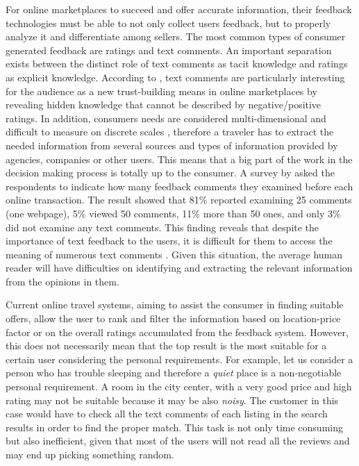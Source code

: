 For online marketplaces to succeed and offer accurate information, their feedback technologies must be able to not only collect users feedback, but to properly analyze it and differentiate among sellers. The most common types of consumer generated feedback are ratings and text comments.  An important separation exists between the distinct role of text comments as tacit knowledge and ratings as explicit knowledge. According to \cite{pavlou2006nature}, text comments are particularly interesting for the audience as a new trust-building means in online marketplaces by revealing hidden knowledge that cannot be described by negative/positive ratings. In addition, consumers needs are considered multi-dimensional and difficult to measure on discrete scales \cite{luo2005information}, therefore a traveler has to extract the needed information from several sources and types of information provided by agencies, companies or other users. This means that a big part of the work in the decision making process is totally up to the consumer. A survey by \cite{pavlou2006institutional} asked the respondents to indicate how many feedback comments they examined before each online transaction. The result showed that 81\% reported examining 25 comments (one webpage), 5\% viewed 50 comments, 11\% more than 50 ones, and only 3\% did not examine any text comments. This finding reveals that despite the importance of text feedback to the users, it is difficult for them to access the meaning of numerous text comments \cite{pavlou2006institutional}.  Given this situation, the average human reader will have difficulties on identifying and extracting the relevant information from the opinions in them.  

Current online travel systems, aiming to assist the consumer in finding suitable offers, allow the user to rank and filter the information based on location-price factor or on the overall ratings accumulated from the feedback system. However, this does not necessarily mean that the top result is the most suitable for a certain user considering the personal requirements. For example, let us consider a person who has trouble sleeping and therefore  a \textit{quiet} place is a non-negotiable personal requirement. A room in the city center, with a very good price and high rating may not be suitable because it may be also \textit{noisy}. The customer in this case would have to check all the text comments of each listing in the search results in order to find the proper match. This task is not only time consuming but also inefficient, given that most of the users will not read all the reviews and may end up picking something random. 

